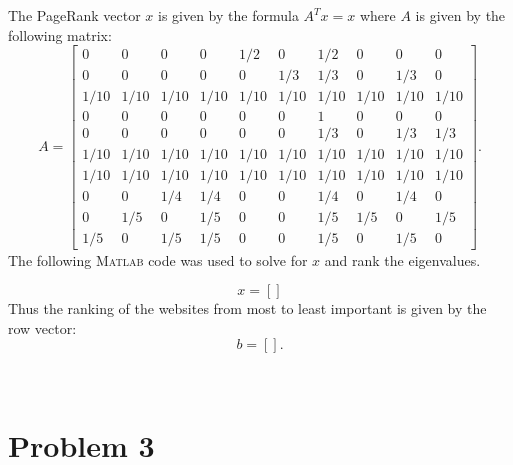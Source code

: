 \documentclass[11pt]{article}
\newcommand{\MATLAB}{\textsc{Matlab}\xspace}
\theoremstyle{definition}
\theoremstyle{remark}
\newcommand{\newquestion}{\hrulefill\vspace{-0.8\baselineskip}\\\null\hrulefill\vspace{-1.0\baselineskip}}
\newcommand{\newpart}{\vspace{-0.5\baselineskip}\hrulefill\vspace{-1.3\baselineskip}}
\theoremstyle{plain}
\begin{document}
The PageRank vector $x$ is given by the formula $A^{T}x=x$ where $A$ is given by the following matrix:
\begin{equation*}
  A=\left[
    \begin{array}{cccccccccc}
      0 & 0 & 0 & 0 & 1/2 & 0 & 1/2 & 0 & 0 & 0\\ %
      0 & 0 & 0 & 0 & 0 & 1/3 & 1/3 & 0 & 1/3 & 0\\ %
      1/10 & 1/10 & 1/10 & 1/10 & 1/10 & 1/10 & 1/10 & 1/10 & 1/10 & 1/10\\ %
      0 & 0 & 0 & 0 & 0 & 0 & 1 & 0 & 0 & 0\\ %
      0 & 0 & 0 & 0 & 0 & 0 & 1/3 & 0 & 1/3 & 1/3\\ %
      1/10 & 1/10 & 1/10 & 1/10 & 1/10 & 1/10 & 1/10 & 1/10 & 1/10 & 1/10\\ %
      1/10 & 1/10 & 1/10 & 1/10 & 1/10 & 1/10 & 1/10 & 1/10 & 1/10 & 1/10\\ %
      0 & 0 & 1/4 & 1/4 & 0 & 0 & 1/4 & 0 & 1/4 & 0\\ %
      0 & 1/5 & 0 & 1/5 & 0 & 0 & 1/5 & 1/5 & 0 & 1/5\\ %
      1/5 & 0 & 1/5 & 1/5 & 0 & 0 & 1/5 & 0 & 1/5 & 0   %
    \end{array}
  \right].
\end{equation*}
The following \MATLAB code was used to solve for $x$ and rank the eigenvalues.

\begin{equation*}
  x=\left[\right]
\end{equation*}
Thus the ranking of the websites from most to least important is given by the row vector:
\begin{equation*}
  b = \left[\right].
\end{equation*}

\newquestion
%
%
\section*{Problem 3}

\newpart
\end{document}
